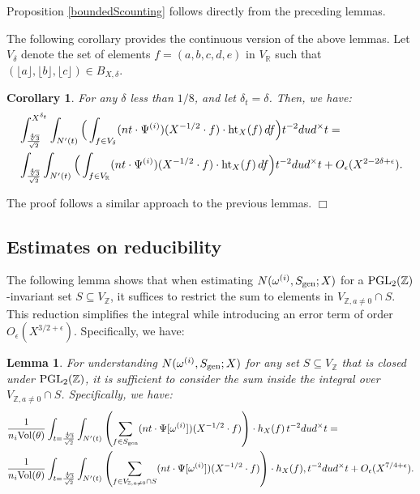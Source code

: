 \documentclass{article}
\def\PGL{{\rm PGL}}
\def\gen{{\rm gen}}
\def\Vol{{\rm Vol}}
\def\R{{\mathbb R}}
\def \h{{\rm ht}}
\newtheorem{cor}[theorem]{Corollary}
\newtheorem{lemma}[theorem]{Lemma}
\newenvironment{proof}{\noindent {\bf Proof:}}{$\Box$ \vspace{2 ex}}
\def \dw{{t^{-2}dud^\times t  }}
\begin{document}
Proposition \ref{boundedScounting} follows directly from the preceding lemmas.

The following corollary provides the continuous version of the above lemmas. Let $V_{\delta}$ denote the set of elements $f = (a, b, c, d, e)$ in $V_{\mathbb{R}}$ such that $(\lfloor a \rfloor, \lfloor b \rfloor, \lfloor c \rfloor) \in B_{X,\delta}$.

\begin{cor}\label{VtoV_R}
    For any $\delta$ less than $1/8$, and let $\delta_t=\delta$. Then, we have:
    \begin{align*}
       &\int_{\frac{\sqrt[4]{3}}{\sqrt{2}}}^{X^{\delta_t}} \int_{N'(t)}   \Big( \int_{f \in V_{\delta}} (nt \cdot \Psi^{(i)})(X^{-1/2} \cdot f) \cdot \h_{X}(f) \, df\Big) \dw =\\
       &\int_{\frac{\sqrt[4]{3}}{\sqrt{2}}} \int_{N'(t)}   \Big(\int_{f \in V_{\R}} (nt \cdot \Psi^{(i)})(X^{-1/2} \cdot f) \cdot \h_{X}(f) \, df \Big)\dw
        + O_{\epsilon}(X^{2-2\delta+\epsilon}).
    \end{align*}
\end{cor}
\begin{proof}
The proof follows a similar approach to the previous lemmas.
\end{proof}



\subsection{Estimates on reducibility}\label{reducibility subsection}
The following lemma shows that when estimating $N(\omega^{(i)}, S_{\gen}; X)$ for a $\PGL_2(\mathbb{Z})$-invariant set $S \subseteq V_{\mathbb{Z}}$, it suffices to restrict the sum to elements in $V_{\mathbb{Z}, a \neq 0} \cap S$. This reduction simplifies the integral while introducing an error term of order $O_{\epsilon}(X^{3/2+\epsilon})$. Specifically, we have:
\begin{lemma}\label{reducibility lemma} For understanding $N(\omega^{(i)}, S_{\gen}; X)$ for any set $S \subseteq V_{\mathbb{Z}}$ that is closed under $\PGL_2(\mathbb{Z})$, it is sufficient to consider the sum inside the integral over $V_{\mathbb{Z}, a \neq 0} \cap S$. Specifically, we have: \begin{align*} &\frac{1}{n_i \Vol(\theta)} \int_{t = \frac{\sqrt[4]{3}}{\sqrt{2}}} \int_{N'(t)}  \left( \sum_{f \in S_{\gen}} (nt \cdot \Psi[\omega^{(i)}])(X^{-1/2} \cdot f) \right) \cdot h_{X}(f) \, \dw =\\ & \frac{1}{n_i \Vol(\theta)} \int_{t = \frac{\sqrt[4]{3}}{\sqrt{2}}} \int_{N'(t)}   \left( \sum_{f \in V_{\mathbb{Z}, a \neq 0} \cap S} (nt \cdot \Psi[\omega^{(i)}])(X^{-1/2} \cdot f) \right) \cdot h_{X}(f) , \dw + O_{\epsilon}(X^{7/4+\epsilon}). \end{align*} \end{lemma}
\end{document}
